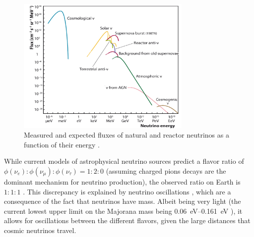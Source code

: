 \begin{figure}
  \centering
  \includegraphics[width=0.75\textwidth]{content/img/neutrino_spectrum.png}
  \caption{
    Measured and expected fluxes of natural and reactor neutrinos as a function of their energy \cite{spiering2012}.
  }
  \label{fig:neutrinos:flux_spectrum}
\end{figure}


While current models of astrophysical neutrino sources predict a flavor ratio of
  $\phi(\nu_e) : \phi(\nu_\mu) : \phi(\nu_\tau) = 1 : 2 : 0$
    (assuming charged pions decays are the dominant mechanism for neutrino production),
the observed ratio on Earth is
  $1 : 1 : 1$ \cite{neutrinos_beacom}.
This discrepancy is explained by neutrino oscillations \cite{neutrinos_beacom},
  which are a consequence of the fact that neutrinos have mass.
Albeit being very light
  (the current lowest upper limit on the Majorana mass being \qtyrange{0.06}{0.161}{\electronvolt} \cite{neutrinos_gando}),
  it allows for oscillations between the different flavors,
    given the large distances that cosmic neutrinos travel.
